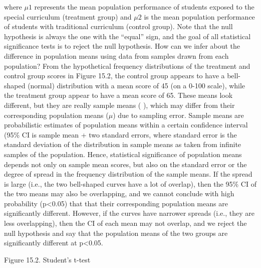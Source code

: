 where $ \mu1 $ represents the mean population performance of students exposed to the special curriculum (treatment group) and $ \mu2 $ is the mean population performance of students with traditional curriculum (control group). Note that the null hypothesis is always the one with the “equal” sign, and the goal of all statistical significance tests is to reject the null hypothesis. How can we infer about the difference in population means using data from samples drawn from each population? From the hypothetical frequency distributions of the treatment and control group scores in Figure 15.2, the control group appears to have a bell-shaped (normal) distribution with a mean score of 45 (on a 0-100 scale), while the treatment group appear to have a mean score of 65. These means look different, but they are really sample means ( ), which may differ from their corresponding population means ($ \mu $) due to sampling error. Sample means are probabilistic estimates of population means within a certain confidence interval (95\% CI is sample mean + two standard errors, where standard error is the standard deviation of the distribution in sample means as taken from infinite samples of the population. Hence, statistical significance of population means depends not only on sample mean scores, but also on the standard error or the degree of spread in the frequency distribution of the sample means. If the spread is large (i.e., the two bell-shaped curves have a lot of overlap), then the 95\% CI of the two means may also be overlapping, and we cannot conclude with high probability (p<0.05) that that their corresponding population means are significantly different. However, if the curves have narrower spreads (i.e., they are less overlapping), then the CI of each mean may not overlap, and we reject the null hypothesis and say that the population means of the two groups are significantly different at p<0.05.

Figure 15.2. Student’s t-test

